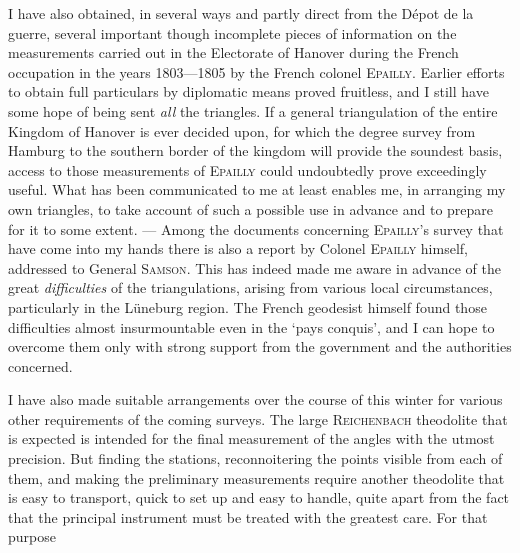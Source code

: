 I have also obtained, in several ways and partly direct from the Dépot de la guerre, several important though incomplete pieces of information on the measurements carried out in the Electorate of Hanover during the French occupation in the years 1803—1805 by the French colonel \textsc{Epailly}. Earlier efforts to obtain full particulars by diplomatic means proved fruitless, and I still have some hope of being sent \textit{all} the triangles. If a general triangulation of the entire Kingdom of Hanover is ever decided upon, for which the degree survey from Hamburg to the southern border of the kingdom will provide the soundest basis, access to those measurements of \textsc{Epailly} could undoubtedly prove exceedingly useful. What has been communicated to me at least enables me, in arranging my own triangles, to take account of such a possible use in advance and to prepare for it to some extent. — Among the documents concerning \textsc{Epailly}’s survey that have come into my hands there is also a report by Colonel \textsc{Epailly} himself, addressed to General \textsc{Samson}. This has indeed made me aware in advance of the great \textit{difficulties} of the triangulations, arising from various local circumstances, particularly in the Lüneburg region. The French geodesist himself found those difficulties almost insurmountable even in the ‘pays conquis’, and I can hope to overcome them only with strong support from the government and the authorities concerned.

I have also made suitable arrangements over the course of this winter for various other requirements of the coming surveys. The large \textsc{Reichenbach} theodolite that is expected is intended for the final measurement of the angles with the utmost precision. But finding the stations, reconnoitering the points visible from each of them, and making the preliminary measurements require another theodolite that is easy to transport, quick to set up and easy to handle, quite apart from the fact that the principal instrument must be treated with the greatest care. For that purpose
